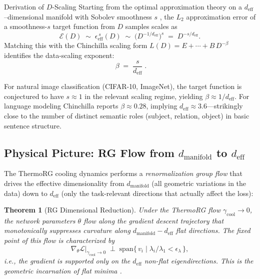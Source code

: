 \documentclass[11pt, a4paper]{article}
\newtheorem{theo}{Theorem}[section]
\theoremstyle{plain}
\begin{document}
\begin{paperenv}{Derivation of $D$-Scaling}
Starting from the optimal approximation theory on a $d_{\mathrm{eff}}$--dimensional manifold with Sobolev smoothness $s$ \citep{devore1998nonlinear}, the $L_{2}$ approximation error of a smoothness-$s$ target function from $D$ samples scales as
\begin{equation}
    \mathcal{E}(D) \;\sim\; \epsilon_{\mathrm{eff}}^{\,s}(D) \;\sim\; \bigl(D^{-1/d_{\mathrm{eff}}}\bigr)^{s} \;=\; D^{-s/d_{\mathrm{eff}}}.
    \label{eq:gen_error_scaling}
\end{equation}
Matching this with the Chinchilla scaling form $L(D) = E + \cdots + B\,D^{-\beta}$ identifies the data-scaling exponent:
\begin{equation}
    \boxed{\;\beta \;=\; \frac{s}{d_{\mathrm{eff}}}\;}.
    \label{eq:beta_def}
\end{equation}
\end{paperenv}

\begin{rema}
For natural image classification (CIFAR-10, ImageNet), the target function is conjectured to have $s \approx 1$ in the relevant scaling regime, yielding $\beta \approx 1/d_{\mathrm{eff}}$. For language modeling Chinchilla reports $\beta \approx 0.28$, implying $d_{\mathrm{eff}} \approx 3.6$---strikingly close to the number of distinct semantic roles (subject, relation, object) in basic sentence structure.
\end{rema}

\subsection{Physical Picture: RG Flow from $d_{\mathrm{manifold}}$ to $d_{\mathrm{eff}}$}
\label{sec:rg_flow_dim}

The ThermoRG cooling dynamics performs a \emph{renormalization group flow} that drives the effective dimensionality from $d_{\mathrm{manifold}}$ (all geometric variations in the data) down to $d_{\mathrm{eff}}$ (only the task-relevant directions that actually affect the loss):

\begin{theo}[RG Dimensional Reduction]
\label{theo:rg_dim_reduction}
Under the ThermoRG flow $\gamma_{\mathrm{cool}} \to 0$, the network parameters $\theta$ flow along the gradient descent trajectory that monotonically suppresses curvature along $d_{\mathrm{manifold}} - d_{\mathrm{eff}}$ flat directions. The fixed point of this flow is characterized by
\begin{equation}
    \nabla_{\theta}\mathcal{L}\Big|_{\gamma_{\mathrm{cool}}\to 0} \;\perp\; \mathrm{span}\bigl\{\, v_i \;\big|\; \lambda_i / \lambda_1 < \epsilon_{\lambda} \,\bigr\},
    \label{eq:flat_minima_condition}
\end{equation}
i.e., the gradient is supported only on the $d_{\mathrm{eff}}$ non-flat eigendirections. This is the geometric incarnation of \emph{flat minima} \citep{hochreiter1997flat}.
\end{theo}
\end{document}
